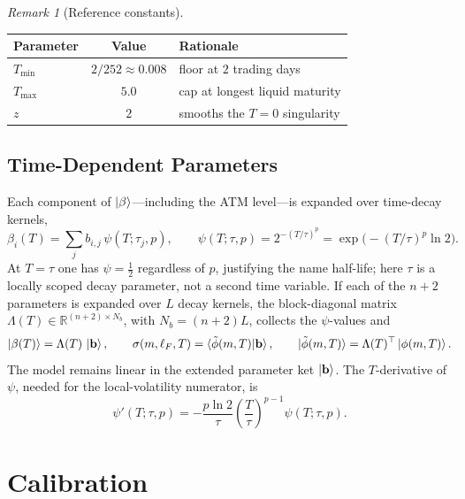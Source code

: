 \documentclass[11pt]{book}
\theoremstyle{plain}
\theoremstyle{definition}
\theoremstyle{remark}
\newtheorem{remark}[theorem]{Remark}
\newcommand{\ket}[1]{\mathinner{\lvert #1 \rangle}}
\newcommand{\braket}[1]{\mathinner{\langle #1 \rangle}}
\newcommand{\parket}{\ket{\beta}}                %
\newcommand{\mln}{m}                             %
\newcommand{\lF}{\ell_F}                         %
\begin{document}
\begin{remark}[Reference constants]\label{rem:prod-values}
\begin{center}
\begin{tabular}{lcl}
\toprule
Parameter & Value & Rationale \\
\midrule
$T_{\min}$ & $2/252 \approx 0.008$ & floor at $2$ trading days \\
$T_{\max}$ & $5.0$                 & cap at longest liquid maturity \\
$z$        & $2$                   & smooths the $T=0$ singularity \\
\bottomrule
\end{tabular}
\end{center}
\end{remark}

\subsection{Time-Dependent Parameters}
\label{sec:time-beta}

Each component of $\parket$---including the ATM level---is expanded over
time-decay kernels,
\[
\beta_i(T) = \sum_{j} b_{i,j}\,\psi(T;\tau_j,p),
\qquad
\psi(T;\tau,p) = 2^{-(T/\tau)^p} = \exp\!\bigl(-(T/\tau)^p\ln 2\bigr).
\]
At $T=\tau$ one has $\psi = \tfrac12$ regardless of $p$, justifying the name
half-life; here $\tau$ is a locally scoped decay parameter, not a second time
variable. If each of the $n+2$ parameters is expanded over $L$ decay kernels,
the block-diagonal matrix $\Lambda(T) \in \mathbb{R}^{(n+2)\times N_b}$, with
$N_b = (n+2)L$, collects the $\psi$-values and
\begin{equation}\label{eq:sigma-full}
\ket{\beta(T)} = \Lambda(T)\,\ket{\mathbf b},
\qquad
\sigma(\mln,\lF,T) = \braket{\tilde\phi(\mln,T)|\mathbf b},
\qquad
\ket{\tilde\phi(\mln,T)} = \Lambda(T)^\top \ket{\phi(\mln,T)}.
\end{equation}
The model remains linear in the extended parameter ket $\ket{\mathbf b}$. The
$T$-derivative of $\psi$, needed for the local-volatility numerator, is
\begin{equation}\label{eq:psi-prime}
\psi'(T;\tau,p) = -\frac{p\ln 2}{\tau}\!\left(\frac{T}{\tau}\right)^{p-1}
\psi(T;\tau,p).
\end{equation}

\section{Calibration}
\label{sec:calibration}
\end{document}

